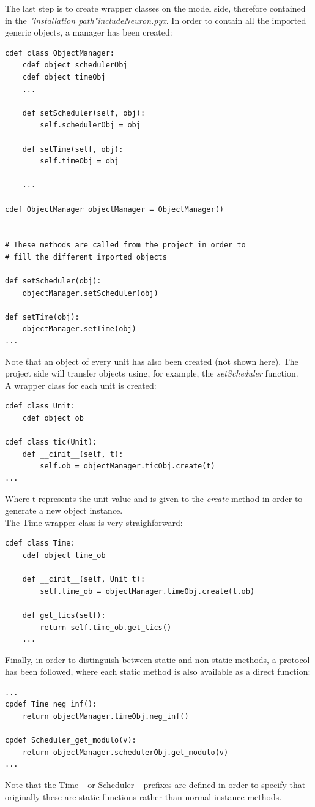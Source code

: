 \documentclass{article}
\begin{document}
The last step is to create wrapper classes on the model side, therefore contained in the \emph{"installation path"\/include\/Neuron.pyx}. In order to contain all the imported generic objects, a manager has been created:
\begin{verbatim}
cdef class ObjectManager:
    cdef object schedulerObj
    cdef object timeObj
    ...

    def setScheduler(self, obj):
        self.schedulerObj = obj

    def setTime(self, obj):
        self.timeObj = obj
        
    ...

cdef ObjectManager objectManager = ObjectManager()


# These methods are called from the project in order to
# fill the different imported objects

def setScheduler(obj):
    objectManager.setScheduler(obj)

def setTime(obj):
    objectManager.setTime(obj)
...
\end{verbatim}
Note that an object of every unit has also been created (not shown here). The project side will transfer objects using, for example, the \emph{setScheduler} function. \\
A wrapper class for each unit is created:
\begin{verbatim}
cdef class Unit:
    cdef object ob

cdef class tic(Unit):
    def __cinit__(self, t):
        self.ob = objectManager.ticObj.create(t)
...
\end{verbatim}
Where t represents the unit value and is given to the \emph{create} method in order to generate a new object instance. \\
The Time wrapper class is very straighforward:
\begin{verbatim}
cdef class Time:
    cdef object time_ob

    def __cinit__(self, Unit t):
        self.time_ob = objectManager.timeObj.create(t.ob)

    def get_tics(self):
        return self.time_ob.get_tics()
    ...
\end{verbatim}
Finally, in order to distinguish between static and non-static methods, a protocol has been followed, where each static method is also available as a direct function:
\begin{verbatim}
...
cpdef Time_neg_inf():
    return objectManager.timeObj.neg_inf()

cpdef Scheduler_get_modulo(v):
    return objectManager.schedulerObj.get_modulo(v)
...
\end{verbatim}
Note that the Time\_ or Scheduler\_ prefixes are defined in order to specify that originally these are static functions rather than normal instance methods. \\ \\
\end{document}
